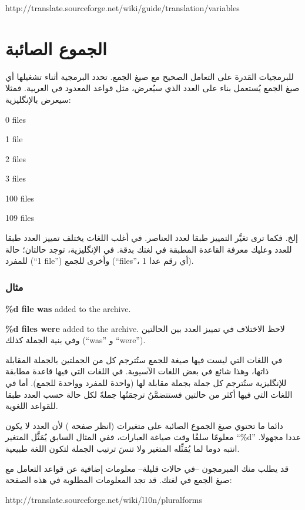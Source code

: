 http://translate.sourceforge.net/wiki/guide/translation/variables

\section{الجموع الصائبة}
للبرمجيات القدرة على التعامل
الصحيح مع صيغ الجمع. تحدد البرمجية أثناء تشغيلها أي صيغ الجمع يُستعمل
بناء على العدد الذي سيُعرض، مثل قواعد المعدود في العربية. فمثلا سيعرض
بالإنگليزية:

\startitemize[1]
\item 0 files
\item 1 file
\item 2 files
\item 3 files
\item 100 files
\item 109 files
\item إلخ.
\stopitemize
فكما ترى تغيَّر التمييز طبقا لعدد العناصر. في أغلب اللغات يختلف تمييز
العدد طبقا للعدد وعليك معرفة القاعدة المطبقة في لغتك بدقة. في
الإنگليزية، توجد حالتان؛ حالة للمفرد (“1 file”) وأخرى للجمع (“files”،
أي رقم عدا 1).

\subsubsection{مثال}
\startitemize[1]
\item {\bf \%d file was} added to the archive.
\item {\bf \%d files were} added to the archive.
\stopitemize
لاحظ الاختلاف في تمييز العدد بين الحالتين وفي بنية الجملة كذلك (“was” و
“were”).

في اللغات التي ليست فيها صيغة للجمع ستُترجم كل من الجملتين بالجملة
المقابلة ذاتها، وهذا شائع في بعض اللغات الآسيوية. في اللغات التي فيها
قاعدة مطابقة للإنگليزية ستُترجم كل جملة بجملة مقابلة لها (واحدة للمفرد
وواحدة للجمع). أما في اللغات التي فيها أكثر من حالتين فستتضمَّنُ
ترجمَتُها جملةً لكل حالة حسب العدد طبقا للقواعد اللغوية.

دائما ما تحتوي صيغ الجموع الصائبة على متغيرات (انظر صفحة
) لأن العدد لا يكون معلومًا سلفًا وقت صياغة
العبارات، ففي المثال السابق يُمَثَّل المتغير ‪“\%d”‬ عددا مجهولا. انتبه
دوما لما يُمَثِّله المتغير ولا تنسَ ترتيب الجملة لتكون اللغة طبيعية.

قد يطلب منك المبرمجون --في حالات قليلة-- معلومات إضافية عن قواعد التعامل
مع صيغ الجمع في لغتك. قد تجد المعلومات المطلوبة في هذه الصفحة:

http://translate.sourceforge.net/wiki/l10n/pluralforms

